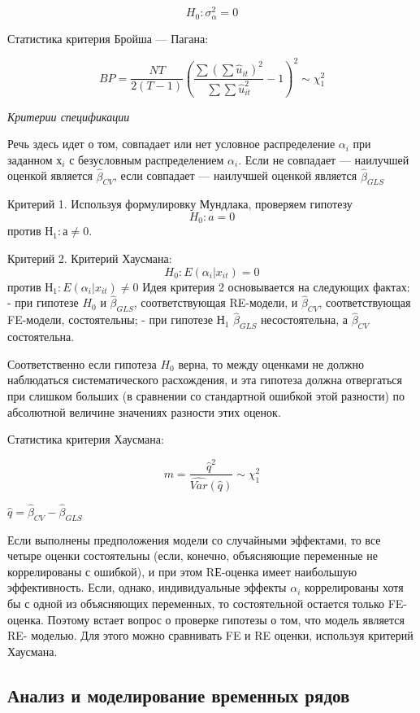 \documentclass[a4paper,8pt]{article} %
\begin{document}
$$ H_0: \sigma_\alpha^2 = 0 $$ 

Статистика критерия Бройша — Пагана:

$$ BP = \frac{NT}{2(T-1)}  \left( \dfrac{\sum (\sum \hat{u}_{it})^2}{\sum \sum \hat{u}_{it}^2}  - 1 \right)^2 \sim \chi^2_1$$


\textit{Критерии спецификации
}

Речь здесь идет о том, совпадает или нет условное распределение $\alpha_i$ при заданном $х_i$  с безусловным распределением $\alpha_i$. Если не совпадает — наилучшей оценкой является $\hat{\beta}_{CV}$, если совпадает — наилучшей оценкой является $\hat{\beta}_{GLS}$

Критерий 1. Используя формулировку Мундлака, проверяем гипотезу
$$H_0: a = 0$$  против $Н_1: а \neq 0$.

Критерий 2. Критерий Хаусмана:
$$H_0: E(\alpha_i|x_{it}) = 0$$ против $Н_1: E(\alpha_i|x_{it}) \neq 0$  
Идея критерия 2 основывается на следующих фактах:
- при гипотезе $H_0$ и $\hat{\beta}_{GLS}$, соответствующая RE-модели, и $\hat{\beta}_{CV}$, соответствующая FE-модели, состоятельны;
- при гипотезе $Н_1$  $\hat{\beta}_{GLS}$ несостоятельна, а $\hat{\beta}_{CV}$ состоятельна.

Соответственно если гипотеза  $H_0$  верна, то между оценками не должно наблюдаться систематического расхождения, и эта гипотеза должна отвергаться при слишком больших (в сравнении со стандартной ошибкой этой
разности) по абсолютной величине значениях разности этих оценок.

Статистика критерия Хаусмана:

$$ m = \frac{\hat{q}^2}{\hat{Var}(\hat{q})} \sim \chi^2_1$$

$\hat{q} = \hat{\beta}_{CV} - \hat{\beta}_{GLS}$

Если выполнены предположения модели со случайными эффектами, то
все четыре оценки состоятельны (если, конечно, объясняющие переменные
не коррелированы с ошибкой), и при этом RЕ-оценка имеет наибольшую эффективность. Если, однако, индивидуальные эффекты $\alpha_i$ коррелированы хотя бы с одной из объясняющих переменных, то состоятельной остается только FE-оценка. Поэтому встает вопрос о проверке гипотезы о том, что модель
является RE- моделью. Для этого можно сравнивать FE и RE оценки, используя критерий Хаусмана.

\newpage

\subsection*{Анализ и моделирование временных  рядов}
\end{document}
